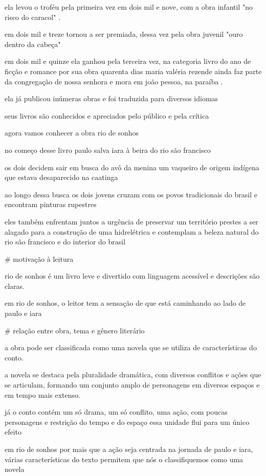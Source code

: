 ela levou o troféu  pela primeira vez em dois mil e nove,  com a obra infantil  "no risco do caracol" . 

em dois mil e treze  tornou a ser premiada,  dessa vez pela obra juvenil  "ouro dentro da cabeça" 

em dois mil e quinze  ela ganhou pela terceira vez,  na categoria  livro do ano de ficção  e romance  por sua obra quarenta dias  
maria valéria rezende  ainda faz parte da congregação de nossa senhora  e mora em joão pessoa, na paraíba . 

ela já publicou inúmeras obras  e foi traduzida para diversos idiomas 

seus livros são conhecidos  e apreciados pelo público  e pela crítica  

agora  vamos conhecer a obra  rio de sonhos 

no começo desse livro  paulo salva iara  à beira do rio são francisco

os dois decidem sair em busca do avô da menina  um vaqueiro de origem indígena  que estava desaparecido na caatinga 

ao longo dessa busca  os dois jovens cruzam com os povos tradicionais do brasil  e encontram pinturas rupestres  

eles também enfrentam  juntos  a urgência de preservar um território  prestes a ser alagado para a construção de uma hidrelétrica  e contemplam a beleza natural do rio são francisco e do interior do brasil  

# motivação à leitura

rio de sonhos  é um livro leve e divertido  com linguagem acessível e descrições são claras.

em rio de sonhos,  o leitor tem a sensação  de que está caminhando ao lado de paulo e iara  


# relação entre obra, tema e gênero literário

a obra pode ser classificada como uma novela que se utiliza de características do conto. 

a novela  se destaca pela pluralidade dramática,  com diversos conflitos e ações que se articulam,  formando um conjunto amplo de personagens em diversos espaços e em tempo mais extenso.

já o conto  contém um só drama,  um só conflito,  uma ação,  com poucas personagens e restrição do tempo e do espaço essa unidade flui para um único efeito

em rio de sonhos  por mais que a ação seja centrada na jornada de paulo e iara,  várias características do texto  permitem que nós o classifiquemos como uma novela  

